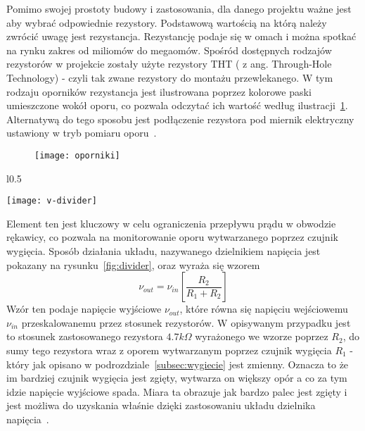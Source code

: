 	Pomimo swojej prostoty budowy i zastosowania, dla danego projektu ważne jest aby wybrać odpowiednie rezystory. Podstawową wartością na którą należy zwrócić uwagę jest rezystancja. Rezystancję podaje się w omach i można spotkać na rynku zakres od miliomów do megaomów. Spośród dostępnych rodzajów rezystorów w projekcie zostały użyte rezystory THT ( z ang. Through-Hole Technology) - czyli tak zwane rezystory do montażu przewlekanego. W tym rodzaju oporników rezystancja jest ilustrowana poprzez kolorowe paski umieszczone wokół oporu, co pozwala odczytać ich wartość według ilustracji~\ref{fig:oporniki}. Alternatywą do tego sposobu jest podłączenie rezystora pod miernik elektryczny ustawiony w tryb pomiaru oporu~\cite{rezystor}. 
		
\begin{figure}[h]
\centering
\texttt{[image: oporniki]}
\label{fig:oporniki}
\end{figure}
	
\begin{wrapfigure}{l}{0.5\textwidth}
\begin{center}
\texttt{[image: v-divider]}
\label{fig:divider}
\end{center}
\end{wrapfigure}

	Element ten jest kluczowy w celu ograniczenia przepływu prądu w obwodzie rękawicy, co pozwala na monitorowanie oporu wytwarzanego poprzez czujnik wygięcia. Sposób działania układu, nazywanego dzielnikiem napięcia jest pokazany na rysunku~\ref{fig:divider}, oraz wyraża się wzorem
	$$
		\nu_{out} = \nu_{in}\left[ \frac{R_2}{R_1+R_2}\right]
	$$
Wzór ten podaje napięcie wyjściowe $\nu_{out}$, które równa się napięciu wejściowemu $\nu_{in}$ przeskalowanemu przez stosunek rezystorów. W opisywanym przypadku jest to stosunek zastosowanego rezystora $4.7 k\Omega$ wyrażonego we wzorze poprzez $R_2$, do sumy tego rezystora wraz z oporem wytwarzanym poprzez czujnik wygięcia $R_1$ - który jak opisano w podrozdziale~\ref{subsec:wygiecie} jest zmienny. Oznacza to że im bardziej czujnik wygięcia jest zgięty, wytwarza on większy opór a co za tym idzie napięcie wyjściowe spada. Miara ta obrazuje jak bardzo palec jest zgięty i jest możliwa do uzyskania właśnie dzięki zastosowaniu układu dzielnika napięcia~\cite{v-divider}.


